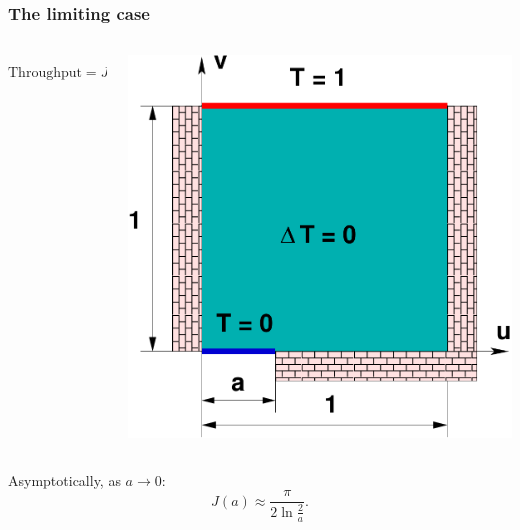 \documentclass[10pt]{beamer}
\begin{document}
\begin{frame}
  \frametitle{The limiting case}

\begin{columns}
  \begin{column}{0.5\textwidth}
  \[
    \text{Throughput} = J(a)
    = \int_0^a \frac{\partial T}{\partial v}\Big|_{v=0} \, du
  \]
  \end{column}
  \begin{column}{0.4\textwidth}
    \includegraphics[width=\textwidth]{pde1.pdf}
  \end{column}
\end{columns}

\pause

\begin{theorem}
Asymptotically, as $a\to0$:
\[
  J(a) \approx \frac{\pi}{2\ln \frac2a}.
\]
\end{theorem}

\end{frame}
\end{document}
